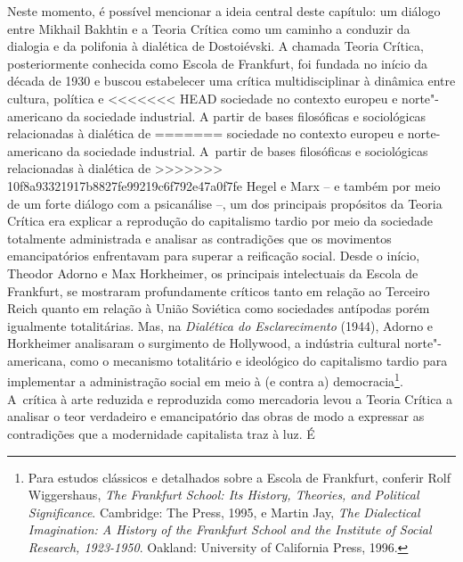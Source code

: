 {Neste momento, é possível mencionar a ideia central deste capítulo: um
diálogo entre Mikhail Bakhtin e a Teoria Crítica como um caminho a
conduzir da dialogia e da polifonia à dialética de Dostoiévski. A
chamada Teoria Crítica, posteriormente conhecida como Escola de
Frankfurt, foi fundada no início da década de 1930 e buscou estabelecer
uma crítica multidisciplinar à dinâmica entre cultura, política e
<<<<<<< HEAD
sociedade no contexto europeu e norte"-americano da sociedade industrial.
A partir de bases filosóficas e sociológicas relacionadas à dialética de
=======
sociedade no contexto europeu e norte-americano da sociedade industrial.
A~partir de bases filosóficas e sociológicas relacionadas à dialética de
>>>>>>> 10f8a93321917b8827fe99219c6f792e47a0f7fe
Hegel e Marx -- e também por meio de um forte diálogo com a psicanálise
--, um dos principais propósitos da Teoria Crítica era explicar a
reprodução do capitalismo tardio por meio da sociedade totalmente
administrada e analisar as contradições que os movimentos emancipatórios
enfrentavam para superar a reificação social. Desde o início, Theodor
Adorno e Max Horkheimer, os principais intelectuais da Escola de
Frankfurt, se mostraram profundamente críticos tanto em relação ao
Terceiro Reich quanto em relação à União Soviética como sociedades
antípodas porém igualmente totalitárias. Mas, na \emph{Dialética do
Esclarecimento} (1944), Adorno e Horkheimer analisaram o surgimento de
Hollywood, a indústria cultural norte"-americana, como o mecanismo
totalitário e ideológico do capitalismo tardio para implementar a
administração social em meio à (e contra a) democracia\footnote{
  Para estudos clássicos e detalhados sobre a Escola de Frankfurt,
  conferir Rolf Wiggershaus, \emph{The Frankfurt School: Its
  History, Theories, and Political Significance}. Cambridge: The 
  Press, 1995, e Martin Jay, \emph{The Dialectical Imagination: A
  History of the Frankfurt School and the Institute of Social Research,
  1923-1950}. Oakland: University of California Press, 1996.}\label{para-estudos-cluxe1ssicos-e-detalhados-sobre-a-escola-de-frankfurt-conferir-rolf-wiggershaus-the-frankfurt-school-its-history-theories-and-political-significance.-cambridge-the-mit-press-1995-e-martin-jay-the-dialectical-imagination-a-history-of-the-frankfurt-school-and-the-institute-of-social-research-1923-1950.-oakland-university-of-california-press-1996.}.
A~crítica à arte reduzida e reproduzida como mercadoria levou a Teoria
Crítica a analisar o teor verdadeiro e emancipatório das obras de modo a
expressar as contradições que a modernidade capitalista traz à luz. É
}
